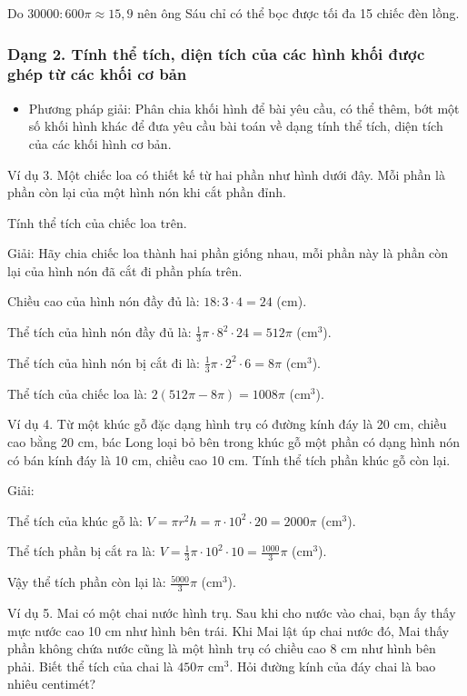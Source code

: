 \documentclass[%
    fontsize=12pt,%
    chapterprefix=false,%
    open=right,%
    twoside=false,%
    numbers=noenddot,%
    headings=optiontohead,%
    final,%
    DIV=15,%
    parskip=half %
]{scrbook}
\begin{document}
Do $30 000 : 600\pi \approx 15,9$ nên ông Sáu chỉ có thể bọc được tối đa 15 chiếc đèn lồng.

\subsubsection{Dạng 2. Tính thể tích, diện tích của các hình khối được ghép từ các khối cơ bản}

\begin{itemize}
  \item Phương pháp giải: Phân chia khối hình để bài yêu cầu, có thể thêm, bớt một số khối hình khác để đưa yêu cầu bài toán về dạng tính thể tích, diện tích của các khối hình cơ bản.
\end{itemize}

Ví dụ 3. Một chiếc loa có thiết kế từ hai phần như hình dưới đây. Mỗi phần là phần còn lại của một hình nón khi cắt phần đỉnh.

Tính thể tích của chiếc loa trên.

Giải: Hãy chia chiếc loa thành hai phần giống nhau, mỗi phần này là phần còn lại của hình nón đã cắt đi phần phía trên.

Chiều cao của hình nón đầy đủ là: $18 : 3 \cdot 4 = 24$ (cm).

Thể tích của hình nón đầy đủ là: $\frac{1}{3} \pi \cdot 8^2 \cdot 24 = 512 \pi$ (cm$^3$).

Thể tích của hình nón bị cắt đi là: $\frac{1}{3} \pi \cdot 2^2 \cdot 6 = 8 \pi$ (cm$^3$).

Thể tích của chiếc loa là: $2(512 \pi - 8 \pi) = 1008 \pi$ (cm$^3$).

Ví dụ 4. Từ một khúc gỗ đặc dạng hình trụ có đường kính đáy là 20 cm, chiều cao bằng 20 cm, bác Long loại bỏ bên trong khúc gỗ một phần có dạng hình nón có bán kính đáy là 10 cm, chiều cao 10 cm. Tính thể tích phần khúc gỗ còn lại.

Giải:

Thể tích của khúc gỗ là: $V = \pi r^2 h = \pi \cdot 10^2 \cdot 20 = 2000 \pi$ (cm$^3$).

Thể tích phần bị cắt ra là: $V = \frac{1}{3} \pi \cdot 10^2 \cdot 10 = \frac{1000}{3} \pi$ (cm$^3$).

Vậy thể tích phần còn lại là: $\frac{5000}{3} \pi$ (cm$^3$).

Ví dụ 5. Mai có một chai nước hình trụ. Sau khi cho nước vào chai, bạn ấy thấy mực nước cao 10 cm như hình bên trái. Khi Mai lật úp chai nước đó, Mai thấy phần không chứa nước cũng là một hình trụ có chiều cao 8 cm như hình bên phải. Biết thể tích của chai là $450 \pi$ cm$^3$. Hỏi đường kính của đáy chai là bao nhiêu centimét?
\end{document}
